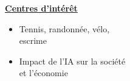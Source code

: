\documentclass[letterpaper,8pt]{extarticle}
\begin{document}
\begin{minipage}[t]{0.28\textwidth}
  \raggedright
  \textbf{\underline{Centres d'intérêt}}\\[-2pt]
  {\scriptsize
    \begin{itemize}[leftmargin=*,itemsep=1pt,parsep=0pt,topsep=0pt,partopsep=0pt]
      \item Tennis, randonnée, vélo, \\escrime
      \item Impact de l'IA sur la société \\et l'économie
    \end{itemize}
  }
\end{minipage}



\end{document}
